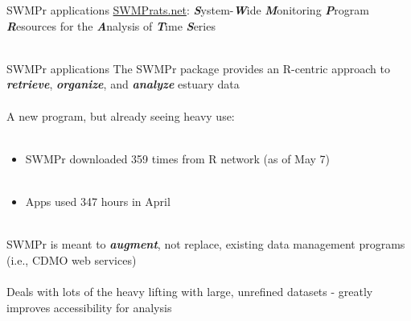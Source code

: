\documentclass[serif]{beamer}\usepackage[]{graphicx}\usepackage[]{color}
\newcommand{\Bigtxt}[1]{\textbf{\textit{#1}}}
\begin{document}
\begin{frame}[t]{SWMPr applications}
\href{https://swmprats.net}{SWMPrats.net}: \Bigtxt{S}ystem-\Bigtxt{W}ide \Bigtxt{M}onitoring \Bigtxt{P}rogram \Bigtxt{R}esources for the \Bigtxt{A}nalysis of \Bigtxt{T}ime \Bigtxt{S}eries \\~\\
\centerline{}
\end{frame}

\begin{frame}{SWMPr applications}
The SWMPr package provides an R-centric approach to \Bigtxt{retrieve}, \Bigtxt{organize}, and \Bigtxt{analyze} estuary data \\~\\
A new program, but already seeing heavy use:\\~\\
\begin{itemize}
\item SWMPr downloaded 359 times from R network (as of May 7) \\~\\
\item Apps used 347 hours in April \\~\\
\end{itemize}
SWMPr is meant to \Bigtxt{augment}, not replace, existing data management programs (i.e., CDMO web services) \\~\\
Deals with lots of the heavy lifting with large, unrefined datasets - greatly improves accessibility for analysis \\~\\
\end{frame}
\end{document}
